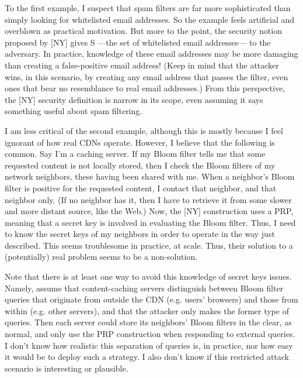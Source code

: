 To the first example, I suspect that spam filters are far more sophisticated than simply looking for whitelisted email addresses.  So the example feels artificial and overblown as practical motivation.  But more to the point, the security notion proposed by [NY] gives S ---the set of whitelisted email addresses--- to the adversary.  In practice, knowledge of these email addresses may be more damaging than creating a false-positive email address! (Keep in mind that the attacker wins, in this scenario, by creating any email address that passes the filter, even ones that bear no resemblance to real email addresses.)  From this perspective, the [NY] security definition is narrow in its scope, even assuming it says something useful about spam filtering.


I am less critical of the second example, although this is mostly because I feel ignorant of how real CDNs operate.  However, I believe that the following is common.  Say I’m a caching server.  If my Bloom filter tells me that some requested content is not locally stored, then I check the Bloom filters of my network neighbors, these having been shared with me.  When a neighbor’s Bloom filter is positive for the requested content, I contact that neighbor, and that neighbor only.  (If no neighbor has it, then I have to retrieve it from some slower and more distant source, like the Web.)  Now, the [NY] construction uses a PRP, meaning that a secret key is involved in evaluating the Bloom filter.  Thus, I need to know the secret keys of my neighbors in order to operate in the way just described.  This seems troublesome in practice, at scale.  Thus, their solution to a (potentially) real problem seems to be a non-solution.

Note that there is at least one way to avoid this knowledge of secret keys issues.  Namely, assume that content-caching servers distinguish between Bloom filter queries that originate from outside the CDN (e.g. users’ browsers) and those from within (e.g. other servers), and that the attacker only makes the former type of queries.  Then each server could store its neighbors’ Bloom filters in the clear, as normal, and only use the PRP construction when responding to external queries.  I don’t know how realistic this separation of queries is, in practice, nor how easy it would be to deploy such a strategy.  I also don’t know if this restricted attack scenario is interesting or plausible.

